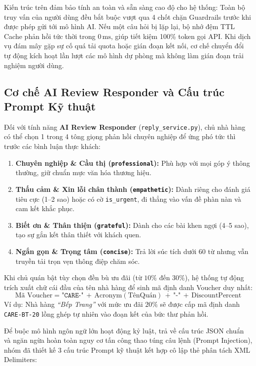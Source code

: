 \documentclass[12pt, a4paper]{article}
\begin{document}
Kiến trúc trên đảm bảo tính an toàn và sẵn sàng cao độ cho hệ thống: Toàn bộ truy vấn của người dùng đều bắt buộc vượt qua 4 chốt chặn Guardrails trước khi được phép gửi tới mô hình AI. Nếu một câu hỏi bị lặp lại, bộ nhớ đệm TTL Cache phản hồi tức thời trong $0\,\mathrm{ms}$, giúp tiết kiệm 100\% token gọi API. Khi dịch vụ đám mây gặp sự cố quá tải quota hoặc gián đoạn kết nối, cơ chế chuyển đổi tự động kích hoạt lần lượt các mô hình dự phòng mà không làm gián đoạn trải nghiệm người dùng.

\newpage
\subsection{Cơ chế AI Review Responder và Cấu trúc Prompt Kỹ thuật}
Đối với tính năng \textbf{AI Review Responder} (\texttt{reply\_service.py}), chủ nhà hàng có thể chọn 1 trong 4 tông giọng phản hồi chuyên nghiệp để ứng phó tức thì trước các bình luận thực khách:
\begin{enumerate}[leftmargin=1.2cm, itemsep=2pt]
    \item \textbf{Chuyên nghiệp \& Cầu thị (\texttt{professional}):} Phù hợp với mọi góp ý thông thường, giữ chuẩn mực văn hóa thương hiệu.
    \item \textbf{Thấu cảm \& Xin lỗi chân thành (\texttt{empathetic}):} Dành riêng cho đánh giá tiêu cực (1--2 sao) hoặc có cờ \texttt{is\_urgent}, đi thẳng vào vấn đề phàn nàn và cam kết khắc phục.
    \item \textbf{Biết ơn \& Thân thiện (\texttt{grateful}):} Dành cho các bài khen ngợi (4--5 sao), tạo sự gắn kết thân thiết với khách quen.
    \item \textbf{Ngắn gọn \& Trọng tâm (\texttt{concise}):} Trả lời súc tích dưới 60 từ nhưng vẫn truyền tải trọn vẹn thông điệp chăm sóc.
\end{enumerate}

Khi chủ quán bật tùy chọn đền bù ưu đãi (từ $10\%$ đến $30\%$), hệ thống tự động trích xuất chữ cái đầu của tên nhà hàng để sinh mã định danh Voucher duy nhất:
\begin{equation}
    \text{Mã Voucher} = \texttt{"CARE-"} \,+\, \text{Acronym}(\text{TênQuán}) \,+\, \texttt{"-"} \,+\, \text{DiscountPercent}
\end{equation}
Ví dụ: Nhà hàng \textit{``Bếp Trang''} với mức ưu đãi $20\%$ sẽ được cấp mã định danh \texttt{CARE-BT-20} lồng ghép tự nhiên vào đoạn kết của bức thư phản hồi.

\vspace{0.15cm}
Để buộc mô hình ngôn ngữ lớn hoạt động kỷ luật, trả về cấu trúc JSON chuẩn và ngăn ngừa hoàn toàn nguy cơ tấn công thao túng câu lệnh (Prompt Injection), nhóm đã thiết kế 3 cấu trúc Prompt kỹ thuật kết hợp cô lập thẻ phân tách XML Delimiters:
\end{document}
